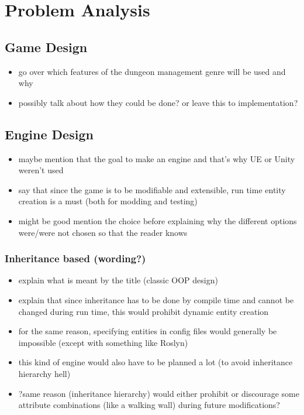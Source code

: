 \chapter{Problem Analysis}


\section{Game Design}

\begin{itemize}
    \item go over which features of the dungeon management genre will be used and why
    \item possibly talk about how they could be done? or leave this to implementation?
\end{itemize}

\section{Engine Design}

\begin{itemize}
    \item maybe mention that the goal to make an engine and that's why UE or Unity
        weren't used
    \item say that since the game is to be modifiable and extensible, run time
        entity creation is a must (both for modding and testing)
    \item might be good mention the choice before explaining why the different
        options were/were not chosen so that the reader knows
\end{itemize}

\subsection{Inheritance based (wording?)}

\begin{itemize}
    \item explain what is meant by the title (classic OOP design)
    \item explain that since inheritance has to be done by compile time and
        cannot be changed during run time, this would prohibit dynamic entity
        creation
    \item for the same reason, specifying entities in config files would generally
        be impossible (except with something like Roslyn)
    \item this kind of engine would also have to be planned a lot (to avoid
        inheritance hierarchy hell)
    \item ?same reason (inheritance hierarchy) would either prohibit or discourage
        some attribute combinations (like a walking wall) during future modifications?
\end{itemize}

